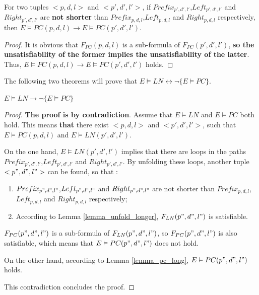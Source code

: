 \documentclass[journal]{IEEEtran}
\begin{document}
\begin{lemma}[]\label{lemma_pc_long}
For two tuples $<p,d,l>$ and $<p',d',l'>$,
if $Prefix_{p',d',l'}$,$Left_{p',d',l'}$ and $Right_{p',d',l'}$ are \textbf{not shorter} than $Prefix_{p,d,l}$,$Left_{p,d,l}$ and $Right_{p,d,l}$ respectively,
then $E\vDash PC(p,d,l)\to E\vDash PC(p',d',l')$.
\end{lemma}
\begin{proof}
It is obvious that $F_{PC}(p,d,l)$ is a sub-formula of $F_{PC}(p',d',l')$,
\textbf{so the unsatisfiability of the former implies the unsatisfiability of the latter}.
Thus,
$E\vDash PC(p,d,l)\to E\vDash PC(p',d',l')$ holds.
\end{proof}

The following two theorems will prove that $E\vDash LN\leftrightarrow \neg \{E\vDash PC\}$.



\begin{theorem}[]\label{thm_pc_nln}
$E\vDash LN\to \neg \{E\vDash PC\}$
\end{theorem}
\begin{proof}
\textbf{The proof is by contradiction}.
Assume that $E\vDash LN$ and $E\vDash PC$ both hold.
This means \textbf{that} there exist $<p,d,l>$ and $<p',d',l'>$,
such that $E\vDash PC(p,d,l)$ and $E\vDash LN(p',d',l')$.

On the one hand,
$E\vDash LN(p',d',l')$ implies that there are loops in the paths $Prefix_{p',d',l'}$,$Left_{p',d',l'}$ and $Right_{p',d',l'}$.
By unfolding these loops,
another tuple $<p",d",l">$ can be found,
so that :
\begin{enumerate}
\item $Prefix_{p",d",l"}$,$Left_{p",d",l"}$ and $Right_{p",d",l"}$ are not shorter than $Prefix_{p,d,l}$,$Left_{p,d,l}$ and $Right_{p,d,l}$ respectively;
\item According to Lemma \ref{lemma_unfold_longer},
$F_{LN}(p",d",l")$ is satisfiable.
\end{enumerate}

$F_{PC}(p",d",l")$ is a sub-formula of $F_{LN}(p",d",l")$,
so $F_{PC}(p",d",l")$ is also satisfiable,
which means that $E\vDash PC(p",d",l")$ does not hold.

On the other hand,
according to Lemma \ref{lemma_pc_long},
$E\vDash PC(p",d",l")$ holds.

This contradiction concludes the proof.
\end{proof}
\end{document}
